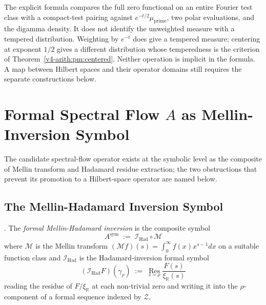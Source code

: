 \begin{remark}
\label{v4-arith:w9-r4:rem:duality-distributional}
The explicit formula compares the full zero functional on an
entire Fourier test class with a compact-test pairing against
$e^{-t/2}\mu_{\mathrm{prime}}$, two polar evaluations, and the
digamma density. It does not identify the unweighted measure with
a tempered distribution. Weighting by $e^{-t}$ does give a
tempered measure; centering at exponent $1/2$ gives a different
distribution whose temperedness is the criterion of
Theorem~\ref{v4-arith:pm:centered}. Neither operation is implicit
in the formula. A map between Hilbert spaces and their operator
domains still requires the separate constructions below.
\end{remark}

\section{Formal Spectral Flow \(A\) as Mellin-Inversion Symbol}
\label{v4-arith:w9-r4:formal-flow}

The candidate spectral-flow operator exists at the symbolic level as
the composite of Mellin transform and Hadamard residue extraction;
the two obstructions that prevent its promotion to a Hilbert-space
operator are named below.

\subsection{The Mellin-Hadamard Inversion Symbol}
\label{v4-arith:w9-r4:formal-flow:symbol}

\begin{definition}
\label{v4-arith:w9-r4:def:formal-MH}
\ClaimStatusDefinitional. The \emph{formal Mellin-Hadamard inversion}
is the composite symbol
\begin{equation}
\label{v4-arith:w9-r4:eq:formal-MH}
A^{\mathrm{sym}}\;:=\;\mathcal{I}_{\mathrm{Had}}\circ\mathcal{M}
\end{equation}
where \(\mathcal{M}\) is the Mellin transform
\((\mathcal{M}f)(s)=\int_{0}^{\infty}f(x)x^{s-1}dx\) on a suitable
function class and \(\mathcal{I}_{\mathrm{Had}}\) is the
Hadamard-inversion formal symbol
\[
(\mathcal{I}_{\mathrm{Had}}F)(\gamma_{\rho})\;:=\;\operatorname*{Res}_{s=\rho}\frac{F(s)}{\xi_{\mathbb{R}}(s)}
\]
reading the residue of \(F/\xi_{\mathbb{R}}\) at each non-trivial zero
and writing it into the \(\rho\)-component of a formal sequence
indexed by \(\mathcal{Z}\).
\end{definition}

